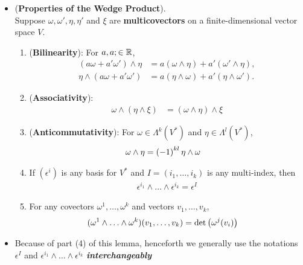 \documentclass[11pt]{article}
\begin{document}
\begin{itemize}
\item \begin{proposition} (\textbf{Properties of the Wedge Product}). \\
Suppose $\omega, \omega', \eta, \eta'$ and $\xi$ are \textbf{multicovectors} on a finite-dimensional vector space $V$.
\begin{enumerate}
\item (\textbf{Bilinearity}): For $a,a; \in {\mathbb R}$,
\begin{align*}
(a \omega + a' \omega')\wedge \eta &=  a (\omega \wedge \eta)+a' (\omega' \wedge \eta),\\
\eta \wedge  (a \omega + a' \omega')&=  a ( \eta \wedge \omega)+a' ( \eta  \wedge \omega').
\end{align*}
\item (\textbf{Associativity}):
\begin{align*}
\omega \wedge (\eta  \wedge \xi) &= (\omega \wedge \eta ) \wedge \xi 
\end{align*}
\item (\textbf{Anticommutativity}): For $\omega \in \Lambda^k(V^{*})$ and $\eta \in \Lambda^l(V^{*})$,
\begin{align}
\omega \wedge \eta &= \left(-1\right)^{kl} \eta \wedge \omega \label{eqn: wedge_product_anticommutative}
\end{align}
\item  If $(\epsilon^i)$ is any basis for $V^{*}$ and $I=(i_1,\ldots, i_k)$ is any multi-index, then
\begin{align}
\epsilon^{i_1} \wedge \ldots \wedge \epsilon^{i_k} = \epsilon^{I} \label{eqn: wedge_product_basis}
\end{align}
\item For any covectors $\omega^1,\ldots, \omega^k$ and vectors $v_1,\ldots,v_k$,
\begin{align}
(\omega^1 \wedge \ldots \wedge \omega^k)(v_1,\ldots,v_k) &= \det\left(\omega^{j}(v_i)\right) \label{eqn: wedge_product_determinant}
\end{align}
\end{enumerate}
\end{proposition}

\item \begin{remark}
Because of part (4) of this lemma, henceforth we generally use the notations $\epsilon^I$ and $\epsilon^{i_1}  \wedge \ldots \wedge \epsilon^{i_k}$ \emph{\textbf{interchangeably}}
\end{remark}


\end{itemize}
\end{document}
